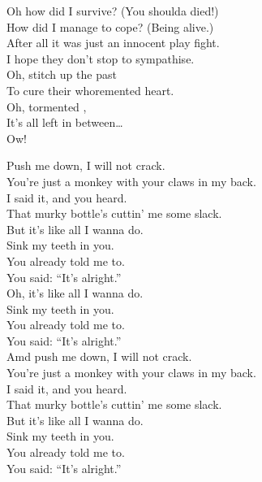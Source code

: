 Oh how did I survive? (You shoulda died!) \\
How did I manage to cope? (Being alive.) \\
After all it was just an innocent play fight. \\
I hope they don't stop to sympathise. \\

Oh, stitch up the past \\
To cure their whoremented heart. \\

Oh, tormented , \\
It's all left in between… \\
Ow! \\




Push me down, I will not crack. \\
You're just a monkey with your claws in my back. \\
I said it, and you heard. \\
That murky bottle's cuttin' me some slack. \\

But it's like all I wanna do. \\
Sink my teeth in you. \\
You already told me to. \\
You said: ``It's alright.'' \\

Oh, it's like all I wanna do. \\
Sink my teeth in you. \\
You already told me to. \\
You said: ``It's alright.'' \\

Amd push me down, I will not crack. \\
You're just a monkey with your claws in my back. \\
I said it, and you heard. \\
That murky bottle's cuttin' me some slack. \\

But it's like all I wanna do. \\
Sink my teeth in you. \\
You already told me to. \\
You said: ``It's alright.'' \\

